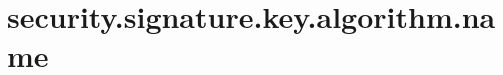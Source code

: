 \section{security.signature.key.algorithm.name}
\label{configuration:SecuritySignatureKeyAlgorithmName}
\TODO
